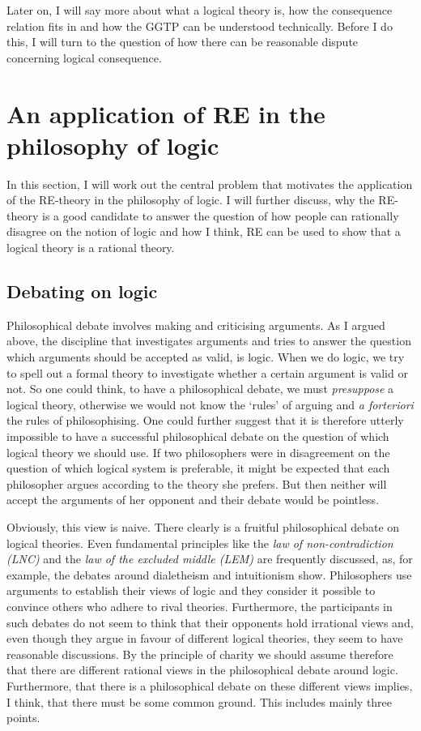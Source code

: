 \documentclass{article}
\begin{document}
Later on, I will say more about what a logical theory is, how the consequence relation fits in and how the GGTP can be understood technically. Before I do this, I will turn to the question of how there can be reasonable dispute concerning logical consequence.

\section{An application of RE in the philosophy of logic}
In this section, I will work out the central problem that motivates the application of the RE-theory in the philosophy of logic. I will further discuss, why the RE-theory is a good candidate to answer the question of how people can rationally disagree on the notion of logic and how I think, RE can be used to show that a logical theory is a rational theory.

\subsection{Debating on logic}\label{sec:debating}
Philosophical debate involves making and criticising arguments. As I argued above, the discipline that investigates arguments and tries to answer the question which arguments should be accepted as valid, is logic. When we do logic, we try to spell out a formal theory to investigate whether a certain argument is valid or not. So one could think, to have a philosophical debate, we must \textit{presuppose} a logical theory, otherwise we would not know the `rules' of arguing and \textit{a forteriori} the rules of philosophising. One could further suggest that it is therefore utterly impossible to have a successful philosophical debate on the question of which logical theory we should use. If two philosophers were in disagreement on the question of which logical system is preferable, it might be expected that each philosopher argues according to the theory she prefers. But then neither will accept the arguments of her opponent and their debate would be pointless.

Obviously, this view is naive. There clearly is a fruitful philosophical debate on logical theories. Even fundamental principles like the \textit{law of non-contradiction (LNC)} and the \textit{law of the excluded middle (LEM)} are frequently discussed, as, for example, the debates around dialetheism and intuitionism show. Philosophers use arguments to establish their views of logic and they consider it possible to convince others who adhere to rival theories. Furthermore, the participants in such debates do not seem to think that their opponents hold irrational views and, even though they argue in favour of different logical theories, they seem to have reasonable discussions. By the principle of charity we should assume therefore that there are different rational views in the philosophical debate around logic. Furthermore, that there is a philosophical debate on these different views implies, I think, that there must be some common ground. This includes mainly three points.
\end{document}
